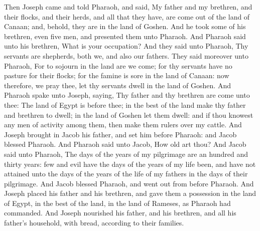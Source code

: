 \begin{biblechapter} %
\verse Then Joseph came and told Pharaoh, and said, My father and my brethren, and their flocks, and their herds, and all that they have, are come out of the land of Canaan; and, behold, they are in the land of Goshen.
\verse And he took some of his brethren, even five men, and presented them unto Pharaoh.
\verse And Pharaoh said unto his brethren, What is your occupation? And they said unto Pharaoh, Thy servants are shepherds, both we, and also our fathers.
\verse They said moreover unto Pharaoh, For to sojourn in the land are we come; for thy servants have no pasture for their flocks; for the famine is sore in the land of Canaan: now therefore, we pray thee, let thy servants dwell in the land of Goshen.
\verse And Pharaoh spake unto Joseph, saying, Thy father and thy brethren are come unto thee:
\verse The land of Egypt is before thee; in the best of the land make thy father and brethren to dwell; in the land of Goshen let them dwell: and if thou knowest any men of activity among them, then make them rulers over my cattle.
\verse And Joseph brought in Jacob his father, and set him before Pharaoh: and Jacob blessed Pharaoh.
\verse And Pharaoh said unto Jacob, How old art thou?
\verse And Jacob said unto Pharaoh, The days of the years of my pilgrimage are an hundred and thirty years: few and evil have the days of the years of my life been, and have not attained unto the days of the years of the life of my fathers in the days of their pilgrimage.
\verse And Jacob blessed Pharaoh, and went out from before Pharaoh.
\verse And Joseph placed his father and his brethren, and gave them a possession in the land of Egypt, in the best of the land, in the land of Rameses, as Pharaoh had commanded.
\verse And Joseph nourished his father, and his brethren, and all his father's household, with bread, according to their families.

\end{biblechapter}
